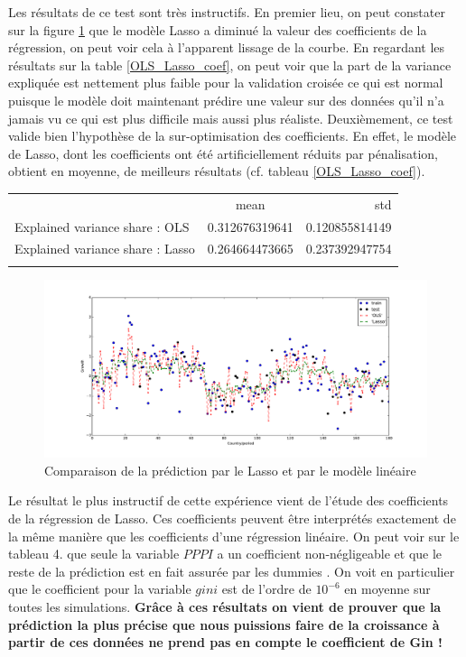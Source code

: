 \documentclass[11pt,a4paper]{article}
\begin{document}
Les résultats de ce test sont très instructifs. En premier lieu, on peut constater sur la figure \ref{OLS_Lasso_graph} que le modèle Lasso a diminué la valeur des coefficients de la régression, on peut voir cela à l'apparent lissage de la courbe. En regardant les résultats sur la table \ref{OLS_Lasso_coef}, on peut voir que la part de la variance expliquée est nettement plus faible pour la validation croisée ce qui est normal puisque le modèle doit maintenant prédire une valeur sur des données qu'il n'a jamais vu ce qui est plus difficile mais aussi plus réaliste. Deuxièmement, ce test valide bien l'hypothèse de la sur-optimisation des coefficients. En effet, le modèle de Lasso, dont les coefficients ont été artificiellement réduits par pénalisation, obtient en moyenne, de meilleurs résultats (cf. tableau \ref{OLS_Lasso_coef}). 


\begin{center}
\begin{tabular}{ l c r }
 & mean & std \\
Explained variance share : OLS &  0.312676319641  & 0.120855814149 \\
Explained variance share : Lasso &  0.264664473665 & 0.237392947754 \\
\label{OLS_Lasso_coef}
\end{tabular}
\end{center}

\begin{figure}
  \centering
  \includegraphics[width=1.\linewidth]{OLS_Lasso.pdf}
\caption{Comparaison de la prédiction par le Lasso et par le modèle linéaire}
\label{OLS_Lasso_graph}
\end{figure}

Le résultat le plus instructif de cette expérience vient de l'étude des coefficients de la régression de Lasso. Ces coefficients peuvent être interprétés exactement de la même manière que les coefficients d'une régression linéaire. On peut voir sur le tableau 4. que seule la variable $PPPI$ a un coefficient non-négligeable et que le reste de la prédiction est en fait assurée par les \og dummies \fg. On voit en particulier que le coefficient pour la variable $gini$ est de l'ordre de $10^{-6}$ en moyenne sur toutes les simulations. \textbf{Grâce à ces résultats on vient de prouver que la prédiction la plus précise que nous puissions faire de la croissance à partir de ces données ne prend pas en compte le coefficient de Gin !}
\end{document}
